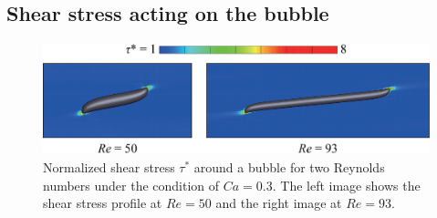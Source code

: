 \documentclass{elsarticle}
\begin{document}

\subsection{Shear stress acting on the bubble}
%
\begin{figure}%
  \centering
  \includegraphics[scale=0.4]{Figure/8-ShearStress}
  \caption{Normalized shear stress $\tau^{\ast}$ around a bubble for 
	two Reynolds 
        numbers under the condition of $Ca = 0.3$. The left image shows the 
        shear stress profile at $Re=50$ and the right image at $Re=93$.
   }
  \label{fig:ShearStress}
\end{figure}
%
\end{document}

